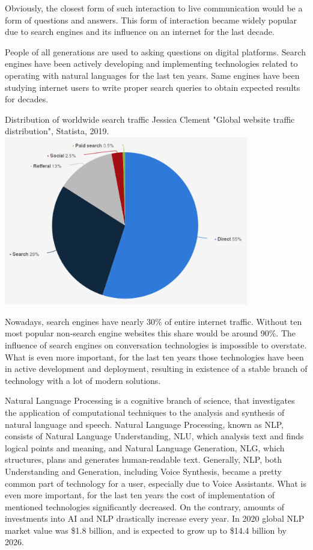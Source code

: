 Obviously, the closest form of such interaction to live communication would be a form of questions and answers.
This form of interaction became widely popular due to search engines and its influence on an internet for the last decade.

People of all generations are used to asking questions on digital platforms.
Search engines have been actively developing and implementing technologies related to operating with natural languages for the last ten years.
Same engines have been studying internet users to write proper search queries to obtain expected results for decades.

\mtfigure
{Distribution of worldwide search traffic}
{Jessica Clement "Global website traffic distribution", Statista, 2019.}
{
    \includegraphics[width=0.8\textwidth,height=\textheight,keepaspectratio]{images/statista_search_engines.png}
}

Nowadays, search engines have nearly 30\% of entire internet traffic.
Without ten most popular non-search engine websites this share would be around 90\%.
The influence of search engines on conversation technologies is impossible to overstate.
What is even more important, for the last ten years those technologies have been in active development and deployment, resulting in existence of a stable branch of technology with a lot of modern solutions.

Natural Language Processing is a cognitive branch of science, that investigates the application of computational techniques to the analysis and synthesis of natural language and speech.
Natural Language Processing, known as NLP, consists of Natural Language Understanding, NLU, which analysis text and finds logical points and meaning, and Natural Language Generation, NLG, which structures, plans and generates human-readable text.
Generally, NLP, both Understanding and Generation, including Voice Synthesis, became a pretty common part of technology for a user, especially due to Voice Assistants.
What is even more important, for the last ten years the cost of implementation of mentioned technologies significantly decreased.
On the contrary, amounts of investments into AI and NLP drastically increase every year.
In 2020 global NLP market value was \$1.8 billion, and is expected to grow up to \$14.4 billion by 2026.
\cite{pwc_ai_nlp}

